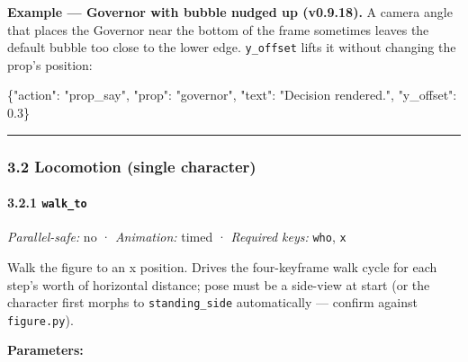 \documentclass[
  12pt,
  letterpaper,
]{book}
\newenvironment{Shaded}{}{}
\newcommand{\DataTypeTok}[1]{\textcolor[rgb]{0.56,0.13,0.00}{#1}}
\newcommand{\FloatTok}[1]{\textcolor[rgb]{0.25,0.63,0.44}{#1}}
\newcommand{\FunctionTok}[1]{\textcolor[rgb]{0.02,0.16,0.49}{#1}}
\newcommand{\StringTok}[1]{\textcolor[rgb]{0.25,0.44,0.63}{#1}}
\begin{document}
\textbf{Example --- Governor with bubble nudged up (v0.9.18).} A
camera angle that places the Governor near the bottom of the frame
sometimes leaves the default bubble too close to the lower edge.
\texttt{y\_offset} lifts it without changing the prop's position:

\begin{Shaded}
\begin{Highlighting}[]
\FunctionTok{\{}\DataTypeTok{"action"}\FunctionTok{:} \StringTok{"prop\_say"}\FunctionTok{,} \DataTypeTok{"prop"}\FunctionTok{:} \StringTok{"governor"}\FunctionTok{,}
 \DataTypeTok{"text"}\FunctionTok{:} \StringTok{"Decision rendered."}\FunctionTok{,}
 \DataTypeTok{"y\_offset"}\FunctionTok{:} \FloatTok{0.3}\FunctionTok{\}}
\end{Highlighting}
\end{Shaded}

\begin{center}\rule{0.5\linewidth}{0.5pt}\end{center}

\subsubsection{3.2 Locomotion (single
character)}\label{locomotion-single-character}

\paragraph{\texorpdfstring{3.2.1
\texttt{walk\_to}}{3.2.1 walk\_to}}\label{walk_to}

\emph{Parallel-safe:} no · \emph{Animation:} timed · \emph{Required
keys:} \texttt{who}, \texttt{x}

Walk the figure to an x position. Drives the four-keyframe walk cycle
for each step's worth of horizontal distance; pose must be a side-view
at start (or the character first morphs to \texttt{standing\_side}
automatically --- confirm against \texttt{figure.py}).

\textbf{Parameters:}
\end{document}
